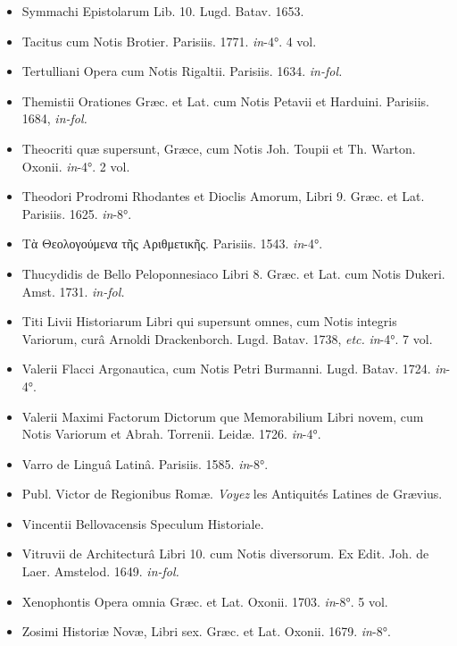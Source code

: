 \documentclass[a4paper, 11pt, oneside, polutonikogreek, french]{article}
\begin{document}
\begin{itemize}
    \item Symmachi Epistolarum Lib. 10. Lugd. Batav. 1653.

    \item Tacitus cum Notis Brotier. Parisiis. 1771. \emph{in}-4°. 4 vol.

    \item Tertulliani Opera cum Notis Rigaltii. Parisiis. 1634. \emph{in-fol.}

    \item Themistii Orationes Græc. et Lat. cum Notis Petavii et Harduini. Parisiis. 1684, \emph{in-fol.}

    \item Theocriti quæ supersunt, Græce, cum Notis Joh. Toupii et Th. Warton. Oxonii. \emph{in}-4°. 2 vol.

    \item Theodori Prodromi Rhodantes et Dioclis Amorum, Libri 9. Græc. et Lat. Parisiis. 1625. \emph{in}-8°.

    \item Τὰ Θεολογούμενα τῆς Αριθμετικῆς. Parisiis. 1543. \emph{in}-4°.

    \item Thucydidis de Bello Peloponnesiaco Libri 8. Græc. et Lat. cum Notis Dukeri. Amst. 1731. \emph{in-fol.}

    \item Titi Livii Historiarum Libri qui supersunt omnes, cum Notis integris Variorum, curâ Arnoldi Drackenborch. Lugd. Batav. 1738, \emph{etc.} \emph{in}-4°. 7 vol.

    \item Valerii Flacci Argonautica, cum Notis Petri Burmanni. Lugd. Batav. 1724. \emph{in}-4°.

    \item Valerii Maximi Factorum Dictorum que Memorabilium Libri novem, cum Notis Variorum et Abrah. Torrenii. Leidæ. 1726. \emph{in}-4°.

    \item Varro de Linguâ Latinâ. Parisiis. 1585. \emph{in}-8°.

    \item Publ. Victor de Regionibus Romæ. \emph{Voyez} les Antiquités Latines de Grævius.

    \item Vincentii Bellovacensis Speculum Historiale.

    \item Vitruvii de Architecturâ Libri 10. cum Notis diversorum. Ex Edit. Joh. de Laer. Amstelod. 1649. \emph{in-fol.}

    \item Xenophontis Opera omnia Græc. et Lat. Oxonii. 1703. \emph{in}-8°. 5 vol.

    \item Zosimi Historiæ Novæ, Libri sex. Græc. et Lat. Oxonii. 1679. \emph{in}-8°.
\end{itemize}
\clearpage
\end{document}
